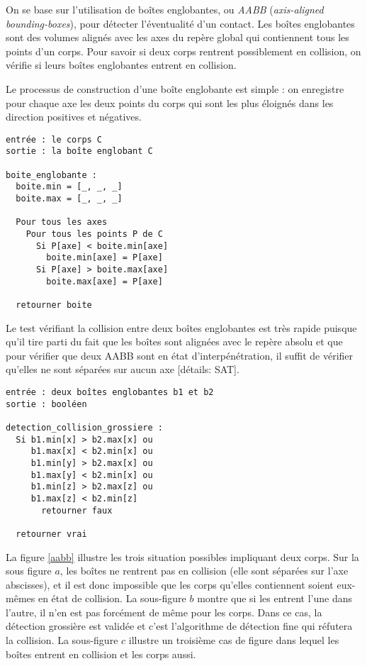 On se base sur l'utilisation de boîtes englobantes, ou \textit{AABB}
(\textit{axis-aligned bounding-boxes}), pour détecter l'éventualité
d'un contact. Les boîtes englobantes sont des volumes alignés avec les
axes du repère global qui contiennent tous les points d'un corps. Pour
savoir si deux corps rentrent possiblement en collision, on vérifie si
leurs boîtes englobantes entrent en collision.

Le processus de construction d'une boîte englobante est simple : on
enregistre pour chaque axe les deux points du corps qui sont les plus
éloignés dans les direction positives et négatives.

\begin{verbatim}
entrée : le corps C
sortie : la boîte englobant C

boite_englobante :
  boite.min = [_, _, _]
  boite.max = [_, _, _]

  Pour tous les axes
    Pour tous les points P de C
      Si P[axe] < boite.min[axe]
        boite.min[axe] = P[axe]
      Si P[axe] > boite.max[axe]
        boite.max[axe] = P[axe]

  retourner boite
\end{verbatim}

Le test vérifiant la collision entre deux boîtes englobantes est très
rapide puisque qu'il tire parti du fait que les boîtes sont alignées
avec le repère absolu et que pour vérifier que deux AABB sont en état
d'interpénétration, il suffit de vérifier qu'elles ne sont séparées
sur aucun axe \cite{ericson05} [détails: SAT].

\begin{verbatim}
entrée : deux boîtes englobantes b1 et b2
sortie : booléen

detection_collision_grossiere :
  Si b1.min[x] > b2.max[x] ou
     b1.max[x] < b2.min[x] ou
     b1.min[y] > b2.max[x] ou
     b1.max[y] < b2.min[x] ou
     b1.min[z] > b2.max[z] ou
     b1.max[z] < b2.min[z]
       retourner faux

  retourner vrai
\end{verbatim}

La figure \ref{aabb} illustre les trois situation possibles impliquant
deux corps. Sur la sous figure $a$, les boîtes ne rentrent pas en
collision (elle sont séparées sur l'axe abscisses), et il est donc
impossible que les corps qu'elles contiennent soient eux-mêmes en état
de collision. La sous-figure $b$ montre que si les entrent l'une dans
l'autre, il n'en est pas forcément de même pour les corps. Dans ce
cas, la détection grossière est validée et c'est l'algorithme de
détection fine qui réfutera la collision. La sous-figure $c$ illustre
un troisième cas de figure dans lequel les boîtes entrent en collision
et les corps aussi.

